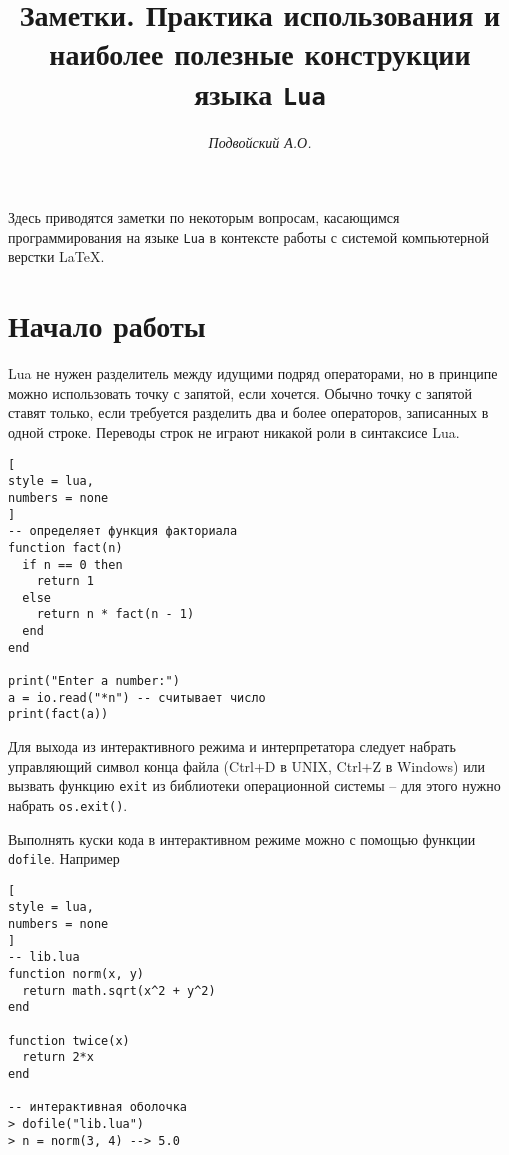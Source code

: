 \documentclass[%
	11pt,
	a4paper,
	utf8,
		]{article}
\begin{document}
\title{Заметки. Практика использования и наиболее полезные конструкции языка \texttt{Lua}}

\author{\itshape Подвойский А.О.}

\date{}
\maketitle

\thispagestyle{fancy}

Здесь приводятся заметки по некоторым вопросам, касающимся программирования на языке \texttt{Lua} в контексте работы с системой компьютерной верстки \LaTeX.



\tableofcontents

\section{Начало работы}

Lua не нужен разделитель между идущими подряд операторами, но в принципе можно использовать точку с запятой, если хочется. Обычно точку с запятой ставят только, если требуется разделить два и более операторов, записанных в одной строке. Переводы строк не играют никакой роли в синтаксисе Lua.

\begin{lstlisting}[
style = lua,
numbers = none	
]
-- определяет функция факториала
function fact(n)
  if n == 0 then
    return 1
  else
    return n * fact(n - 1)
  end
end

print("Enter a number:")
a = io.read("*n") -- считывает число
print(fact(a))
\end{lstlisting}

Для выхода из интерактивного режима и интерпретатора следует набрать управляющий символ конца файла (\textsf{Ctrl+D} в UNIX, \textsf{Ctrl+Z} в Windows) или вызвать функцию \texttt{exit} из библиотеки операционной системы -- для этого нужно набрать \texttt{os.exit()}.

Выполнять куски кода в интерактивном режиме можно с помощью функции \texttt{dofile}. Например
\begin{lstlisting}[
style = lua,
numbers = none	
]
-- lib.lua
function norm(x, y)
  return math.sqrt(x^2 + y^2)
end

function twice(x)
  return 2*x
end

-- интерактивная оболочка
> dofile("lib.lua")
> n = norm(3, 4) --> 5.0
\end{lstlisting}
\end{document}
